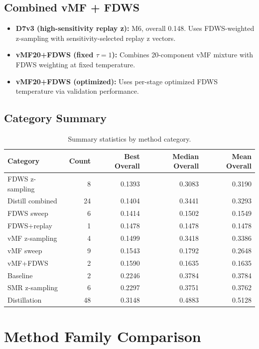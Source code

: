 \documentclass[11pt,a4paper]{article}
\begin{document}
\subsection{Combined vMF + FDWS}

\begin{itemize}
    \item \textbf{D7v3 (high-sensitivity replay z):} M6, overall 0.148. Uses FDWS-weighted
    z-sampling with sensitivity-selected replay z vectors.
    \item \textbf{vMF20+FDWS (fixed $\tau=1$):} Combines 20-component vMF mixture with
    FDWS weighting at fixed temperature.
    \item \textbf{vMF20+FDWS (optimized):} Uses per-stage optimized FDWS temperature
    via validation performance.
\end{itemize}

\subsection{Category Summary}

\begin{table}[H]
\centering
\caption{Summary statistics by method category.}
\begin{tabular}{lrrrr}
\toprule
Category & Count & Best Overall & Median Overall & Mean Overall \\
\midrule
    FDWS z-sampling & 8 & 0.1393 & 0.3083 & 0.3190 \\
    Distill combined & 24 & 0.1404 & 0.3441 & 0.3293 \\
    FDWS sweep & 6 & 0.1414 & 0.1502 & 0.1549 \\
    FDWS+replay & 1 & 0.1478 & 0.1478 & 0.1478 \\
    vMF z-sampling & 4 & 0.1499 & 0.3418 & 0.3386 \\
    vMF sweep & 9 & 0.1543 & 0.1792 & 0.2648 \\
    vMF+FDWS & 2 & 0.1590 & 0.1635 & 0.1635 \\
    Baseline & 2 & 0.2246 & 0.3784 & 0.3784 \\
    SMR z-sampling & 6 & 0.2297 & 0.3751 & 0.3762 \\
    Distillation & 48 & 0.3148 & 0.4883 & 0.5128 \\
\bottomrule
\end{tabular}
\end{table}

\section{Method Family Comparison}
\end{document}
